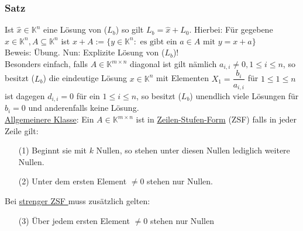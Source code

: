 \subsubsection{Satz}
\label{1.4.4}
Ist $\hat{x}\in\mathbb{K}^n$ eine Lösung von (\hyperref[Lb]{$L_b$}) so gilt $L_b=\hat{x}+L_0$.  Hierbei: Für gegebene $x\in\mathbb{K}^n,A\subseteq \mathbb{K}^n$ ist $x+A:=\{y\in \mathbb{K}^n:\text{ es gibt ein }a\in A\text{ mit } y=x+a\}$\\
Beweis: Übung.
Nun: Explizite Lösung von (\hyperref[Lb]{$L_b$})!\\
Besonders einfach, falls $A\in\mathbb{K}^{m\times n}$ diagonal ist gilt nämlich $a_{i,i}\not=0,1\leq i\leq n$, so besitzt (\hyperref[Lb]{$L_b$}) die eindeutige Lösung $x\in\mathbb{K}^n$ mit Elementen $X_1=\dfrac{b_i}{a_{i,i}}$ für $1\leq 1\leq n$ ist dagegen $d_{i,i}=0$ für ein $1\leq i\leq n$, so besitzt (\hyperref[Lb]{$L_b$}) unendlich viele Lösungen für $b_i=0$ und anderenfalls keine Lösung.\\
\underline{Allgemeinere Klasse}: Ein $A\in \mathbb{K}^{m\times n}$ ist in \underline{Zeilen-Stufen-Form} (ZSF) falls in jeder Zeile gilt:
\begin{enumerate}
\item[(1)] Beginnt sie mit $k$ Nullen, so stehen unter diesen Nullen lediglich weitere Nullen.\\
\item[(2)] Unter dem ersten Element $\not= 0$ stehen nur Nullen.\\
\end{enumerate}
Bei \underline{strenger ZSF } muss zusätzlich gelten:
\begin{enumerate}
\item[(3)] Über jedem ersten Element $\not= 0$ stehen nur Nullen\\
\end{enumerate}
